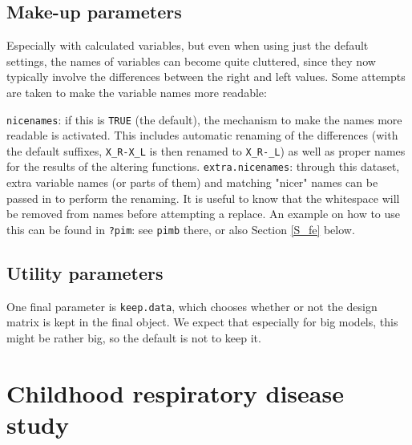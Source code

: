 \documentclass[12pt]{article}
\newcommand{\cd}[1]{\texttt{#1}}%
\begin{document}
\subsection{Make-up parameters}\label{SS_beauty}
Especially with calculated variables, but even when using just the default settings, the names of variables can become quite cluttered, since they now typically involve the differences between the right and left values. Some attempts are taken to make the variable names more readable:

\cd{nicenames}: if this is \cd{TRUE} (the default), the mechanism to make the names more readable is activated. This includes automatic renaming of the differences (with the default suffixes, \cd{X\_R-X\_L} is then renamed to \cd{X\_R-\_L}) as well as proper names for the results of the altering functions.
\cd{extra.nicenames}: through this dataset, extra variable names (or parts of them) and matching "nicer" names can be passed in to perform the renaming. It is useful to know that the whitespace will be removed from names before attempting a replace. An example on how to use this can be found in \cd{?pim}: see \cd{pimb} there, or also Section \ref{S_fe} below.
\subsection{Utility parameters}\label{SS_utility}
One final parameter is \cd{keep.data}, which chooses whether or not the design matrix is kept in the final object. We expect that especially for big models, this might be rather big, so the default is not to keep it.
\section{Childhood respiratory disease study}\label{S_crds}
\end{document}

